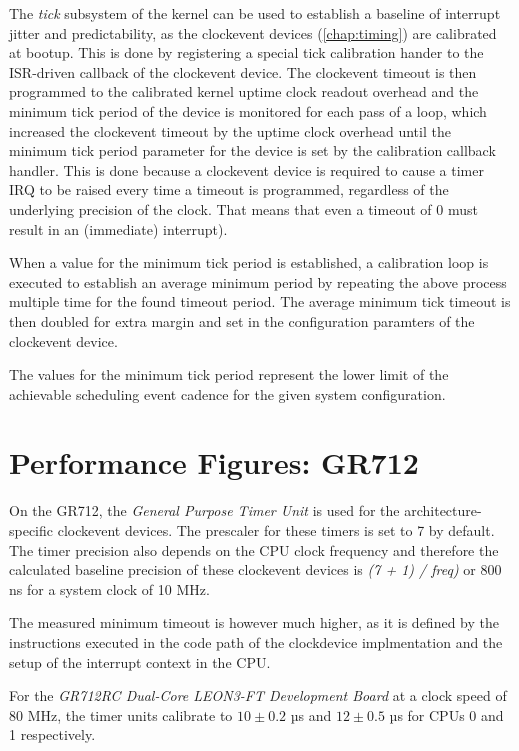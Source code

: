 The \emph{tick} subsystem of the kernel can be used to establish a baseline
of interrupt jitter and predictability, as the clockevent devices (\ref{chap:timing})
are calibrated at bootup. This is done by registering a special tick calibration
hander to the ISR-driven callback of the clockevent device. The clockevent
timeout is then programmed to the calibrated kernel uptime clock readout overhead
and the minimum tick period of the device is monitored for each pass of a loop,
which increased the clockevent timeout by the uptime clock overhead until the
minimum tick period parameter for the device is set by the calibration callback
handler. This is done because a clockevent device is required to
cause a timer IRQ to be raised every time a timeout is programmed, regardless
of the underlying precision of the clock. That means that even a timeout of 0
must result in an (immediate) interrupt).

When a value for the minimum tick period is established, a calibration loop
is executed to establish an average minimum period by repeating the
above process multiple time for the found timeout period. The average
minimum tick timeout is then doubled for extra margin and set in the
configuration paramters of the clockevent device.

The values for the minimum tick period represent the lower limit of the
achievable scheduling event cadence for the given system configuration.


\section{Performance Figures: GR712}

On the GR712, the \emph{General Purpose Timer Unit}\cite{GR712UM} is used for
the architecture-specific clockevent devices. The prescaler for these timers
is set to 7 by default. The timer precision also depends on the CPU clock
frequency and therefore the calculated baseline precision of these clockevent
devices is \emph{ (7 + 1) / freq)} or 800 ns for a system clock of 10 MHz.

The measured minimum timeout is however much higher, as it is defined by the
instructions executed in the code path of the clockdevice implmentation and the
setup of the interrupt context in the CPU.

For the \emph{GR712RC Dual-Core LEON3-FT Development Board} at a clock speed of
80 MHz, the timer units calibrate to $10 \pm 0.2$ µs and $12 \pm 0.5$ µs for
CPUs 0 and 1 respectively.

